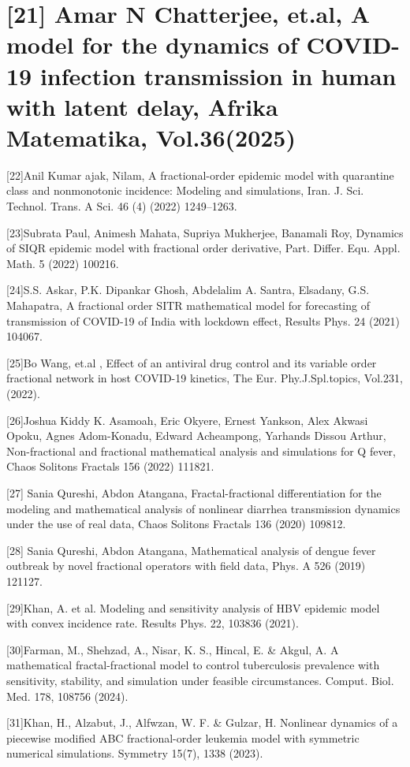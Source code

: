 \documentclass[10pt]{NSP1}
\begin{document}
\section*{[21] Amar N Chatterjee, et.al, A model for the dynamics of COVID-19 infection transmission in human with latent delay, Afrika Matematika, Vol.36(2025)}

[22]Anil Kumar ajak, Nilam, A fractional-order epidemic model with quarantine class and nonmonotonic incidence: Modeling and simulations, Iran. J. Sci. Technol. Trans. A Sci. 46 (4) (2022) 1249–1263.

[23]Subrata Paul, Animesh Mahata, Supriya Mukherjee, Banamali Roy, Dynamics of SIQR epidemic model with fractional order derivative, Part. Differ. Equ. Appl. Math. 5 (2022) 100216.

[24]S.S. Askar, P.K. Dipankar Ghosh, Abdelalim A. Santra, Elsadany, G.S. Mahapatra, A fractional order SITR mathematical model for forecasting of transmission of COVID-19 of India with lockdown effect, Results Phys. 24 (2021) 104067.

[25]Bo Wang, et.al , Effect of an antiviral drug control and its variable order fractional network in host COVID-19 kinetics, The Eur. Phy.J.Spl.topics, Vol.231,(2022).

[26]Joshua Kiddy K. Asamoah, Eric Okyere, Ernest Yankson, Alex Akwasi Opoku, Agnes Adom-Konadu, Edward Acheampong, Yarhands Dissou Arthur, Non-fractional and fractional mathematical analysis and simulations for Q fever, Chaos Solitons Fractals 156 (2022) 111821.

[27] Sania Qureshi, Abdon Atangana, Fractal-fractional differentiation for the modeling and mathematical analysis of nonlinear diarrhea transmission dynamics under the use of real data, Chaos Solitons Fractals 136 (2020) 109812.

[28] Sania Qureshi, Abdon Atangana, Mathematical analysis of dengue fever outbreak by novel fractional operators with field data, Phys. A 526 (2019) 121127.

[29]Khan, A. et al. Modeling and sensitivity analysis of HBV epidemic model with convex incidence rate. Results Phys. 22, 103836 (2021).

[30]Farman, M., Shehzad, A., Nisar, K. S., Hincal, E. \& Akgul, A. A mathematical fractal-fractional model to control tuberculosis prevalence with sensitivity, stability, and simulation under feasible circumstances. Comput. Biol. Med. 178, 108756 (2024).

[31]Khan, H., Alzabut, J., Alfwzan, W. F. \& Gulzar, H. Nonlinear dynamics of a piecewise modified ABC fractional-order leukemia model with symmetric numerical simulations. Symmetry 15(7), 1338 (2023).
\end{document}
